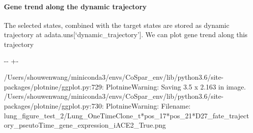 \documentclass[letterpaper,10pt,english]{sphinxmanual}
\newlength\nbsphinxcodecellspacing
\begin{document}
\paragraph{Gene trend along the dynamic trajectory}
\label{\detokenize{20210121_lung_data:Gene-trend-along-the-dynamic-trajectory}}
The selected states, combined with the target states are stored as dynamic trajectory at adata.uns{[}‘dynamic\_trajectory’{]}. We can plot gene trend along this trajectory

{
\begin{sphinxVerbatim}[commandchars=\\\{\}]
\llap{\color{nbsphinxin}[21]:\,\hspace{\fboxrule}\hspace{\fboxsep}}
    \PYG{p}{[}      \PYG{p}{]}

\end{sphinxVerbatim}
}

{

\kern-\sphinxverbatimsmallskipamount\kern-\baselineskip
\kern+\FrameHeightAdjust\kern-\fboxrule
\vspace{\nbsphinxcodecellspacing}

\begin{sphinxVerbatim}[commandchars=\\\{\}]
/Users/shouwenwang/miniconda3/envs/CoSpar\_env/lib/python3.6/site-packages/plotnine/ggplot.py:729: PlotnineWarning: Saving 3.5 x 2.163 in image.
/Users/shouwenwang/miniconda3/envs/CoSpar\_env/lib/python3.6/site-packages/plotnine/ggplot.py:730: PlotnineWarning: Filename: lung\_figure\_test\_2/Lung\_OneTimeClone\_t*pos\_17*pos\_21*D27\_fate\_trajectory\_pseutoTime\_gene\_expression\_iACE2\_True.png
\end{sphinxVerbatim}
}
\end{document}
